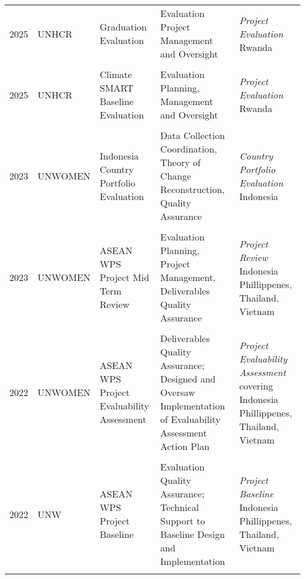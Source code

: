 \documentclass[
  10pt,
]{article}
\begin{document}
\begin{landscape}
\begin{tabularx}{\linewidth}{|l|l|X|X|X|}
2025 & UNHCR & Graduation Evaluation & Evaluation Project Management and Oversight & \emph{Project Evaluation} Rwanda \\ &&&&  \\

2025 & UNHCR & Climate SMART Baseline Evaluation & Evaluation Planning, Management and Oversight & \emph{Project Evaluation} Rwanda \\ &&&&  \\

2023 & UNWOMEN & Indonesia Country Portfolio Evaluation & Data Collection Coordination, Theory of Change Reconstruction, Quality Assurance & \emph{Country Portfolio Evaluation} Indonesia \\ &&&&  \\

2023 & UNWOMEN & ASEAN WPS Project Mid Term Review & Evaluation Planning, Project Management, Deliverables Quality Assurance & \emph{Project Review} Indonesia Phillippenes, Thailand, Vietnam \\ &&&&  \\

2022 & UNWOMEN & ASEAN WPS Project Evaluability Assessment & Deliverables Quality Assurance; Designed and Oversaw Implementation of Evaluability Assessment Action Plan & \emph{Project Evaluability Assessment} covering Indonesia Phillippenes, Thailand, Vietnam \\ &&&&  \\

2022 & UNW & ASEAN WPS Project Baseline & Evaluation Quality Assurance; Technical Support to Baseline Design and Implementation & \emph{Project Baseline} Indonesia Phillippenes, Thailand, Vietnam \\ &&&&  \\
\hline

\end{tabularx}
\end{landscape}
\end{document}
